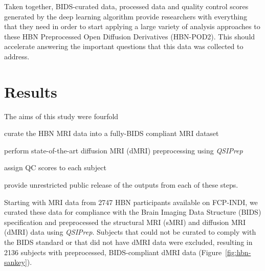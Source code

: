 \documentclass[fleqn,10pt]{wlscirep}
\begin{document}
Taken together, BIDS-curated data, processed data and quality control scores
generated by the deep learning algorithm provide researchers with everything
that they need in order to start applying a large variety of analysis approaches
to these HBN Preprocessed Open Diffusion Derivatives (HBN-POD2). This should
accelerate answering the important questions that this data was collected to
address.


\section*{Results}

The aims of this study were fourfold
\begin{enumerate*}[%
    label=(\roman*),%
    before=\unskip{: },%
    itemjoin={{, }},%
    itemjoin*={{, and }}]
    \item curate the HBN MRI data into a fully-BIDS compliant MRI dataset
    \item perform state-of-the-art diffusion MRI (dMRI) preprocessing using \emph{QSIPrep}
    \item assign QC scores to each subject
    \item provide unrestricted public release of the outputs from each of these
    steps.
\end{enumerate*}

Starting with MRI data from \num{2747} HBN participants available on FCP-INDI,
we curated these data for compliance with the Brain Imaging Data Structure
(BIDS) specification \cite{gorgolewski2016-lh} and preprocessed the structural
MRI (sMRI) and diffusion MRI (dMRI) data using \emph{QSIPrep}. Subjects that
could not be curated to comply with the BIDS standard or that did not have dMRI
data were excluded, resulting in \num{2136} subjects with preprocessed,
BIDS-compliant dMRI data (Figure~\ref{fig:hbn-sankey}).
\end{document}
